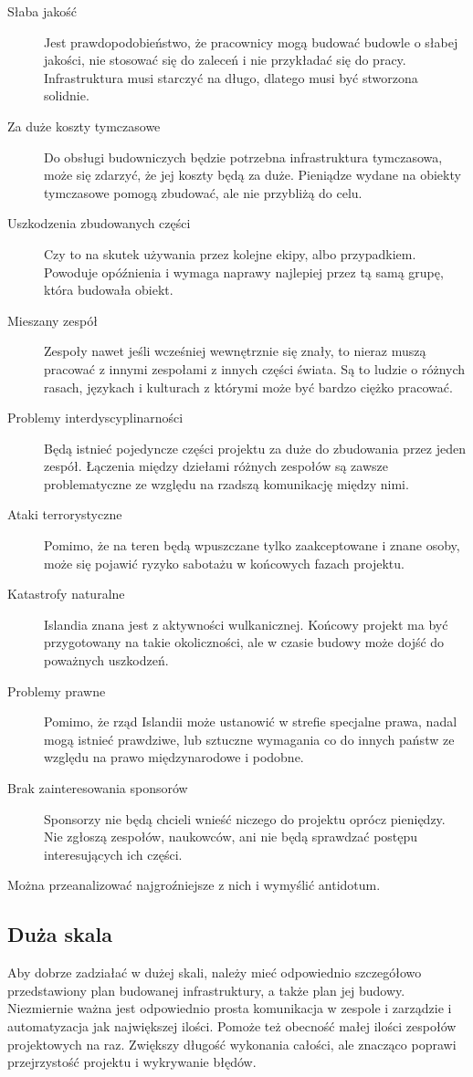\begin{description}
 \item[Słaba jakość] Jest prawdopodobieństwo, że pracownicy mogą budować budowle o słabej jakości, nie stosować się do zaleceń i nie przykładać się do pracy. Infrastruktura musi starczyć na długo, dlatego musi być stworzona solidnie.
 \item[Za duże koszty tymczasowe] Do obsługi budowniczych będzie potrzebna infrastruktura tymczasowa, może się zdarzyć, że jej koszty będą za duże. Pieniądze wydane na obiekty tymczasowe pomogą zbudować, ale nie przybliżą do celu.
 \item[Uszkodzenia zbudowanych części] Czy to na skutek używania przez kolejne ekipy, albo przypadkiem. Powoduje opóźnienia i wymaga naprawy najlepiej przez tą samą grupę, która budowała obiekt.
 \item[Mieszany zespół] Zespoły nawet jeśli wcześniej wewnętrznie się znały, to nieraz muszą pracować z innymi zespołami z innych części świata. Są to ludzie o różnych rasach, językach i kulturach z którymi może być bardzo ciężko pracować.
 \item[Problemy interdyscyplinarności] Będą istnieć pojedyncze części projektu za duże do zbudowania przez jeden zespół. Łączenia między dziełami różnych zespołów są zawsze problematyczne ze względu na rzadszą komunikację między nimi.
 \item[Ataki terrorystyczne] Pomimo, że na teren będą wpuszczane tylko zaakceptowane i znane osoby, może się pojawić ryzyko sabotażu w końcowych fazach projektu.
 \item[Katastrofy naturalne] Islandia znana jest z aktywności wulkanicznej. Końcowy projekt ma być przygotowany na takie okoliczności, ale w czasie budowy może dojść do poważnych uszkodzeń.
 \item[Problemy prawne] Pomimo, że rząd Islandii może ustanowić w strefie specjalne prawa, nadal mogą istnieć prawdziwe, lub sztuczne wymagania co do innych państw ze względu na prawo międzynarodowe i podobne.
 \item[Brak zainteresowania sponsorów] Sponsorzy nie będą chcieli wnieść niczego do projektu oprócz pieniędzy. Nie zgłoszą zespołów, naukowców, ani nie będą sprawdzać postępu interesujących ich części.
\end{description}
Można przeanalizować najgroźniejsze z nich i wymyślić antidotum.

\subsection{Duża skala}
Aby dobrze zadziałać w dużej skali, należy mieć odpowiednio szczegółowo przedstawiony plan budowanej infrastruktury, a także plan jej budowy.
Niezmiernie ważna jest odpowiednio prosta komunikacja w zespole i zarządzie i automatyzacja jak największej ilości.
Pomoże też obecność małej ilości zespołów projektowych na raz. Zwiększy długość wykonania całości, ale znacząco poprawi przejrzystość projektu i wykrywanie błędów.

